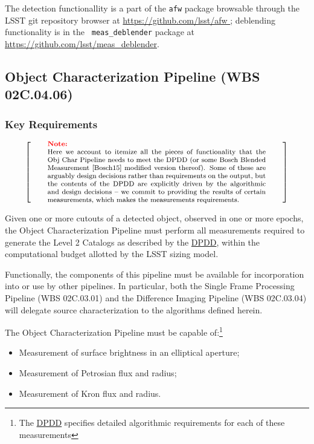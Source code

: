 \documentclass[12pt]{article}
\newcommand{\ds}[2]{{\color{blue} \href{https://docushare.lsstcorp.org/docushare/dsweb/Get/#1}{#2}}\xspace}
\newcommand{\DPDD}{\ds{LSE-163}{DPDD}}
\newcommand{\wbsSFM}{WBS 02C.03.01}
\newcommand{\wbsDiffim}{WBS 02C.03.04}
\newcommand{\wbsObjChar}{WBS 02C.04.06}
\newenvironment{note}[1][Note]
{
  \begin{displaymath}
    \left[ \qquad
    \begin{minipage}[h]{.75\linewidth}
      \color{red} \footnotesize
      \textbf{#1:} \newline
      \color{black}
}
{
    \end{minipage}
    \normalsize
    \qquad \right]
  \end{displaymath}
}
\begin{document}
The detection functionallity is a part of the {\tt afw} package
browsable through the LSST git repository browser at
\url{https://github.com/lsst/afw }; deblending functionality is in the {\tt
meas\_deblender} package at \url{https://github.com/lsst/meas_deblender}.

\clearpage

\subsection{Object Characterization Pipeline (\wbsObjChar)}

\subsubsection{Key Requirements}

\begin{note}
Here we account to itemize all the pieces of functionality that the Obj Char Pipeline needs to meet the DPDD (or some Bosch Blended Measurement \cite{Bosch15} modified version thereof). Some of these are arguably design decisions rather than requirements on the output, but the contents of the DPDD are explicitly driven by the algorithmic and design decisions -- we commit to providing the results of certain measurements, which makes the measurements requirements.
\end{note}

Given one or more cutouts of a detected object, observed in one or more epochs, the Object Characterization Pipeline must perform all measurements required to generate the Level 2 Catalogs as described by the \DPDD{}, within the computational budget allotted by the LSST sizing model.

Functionally, the components of this pipeline must be available for incorporation into or use by other pipelines. In particular, both the Single Frame Processing Pipeline (\wbsSFM) and the Difference Imaging Pipeline (\wbsDiffim) will delegate source characterization to the algorithms defined herein.

The Object Characterization Pipeline must be capable of:\footnote{The \DPDD{} specifies detailed algorithmic requirements for each of these measurements}
\begin{itemize}
  \item{Measurement of surface brightness in an elliptical aperture;}
  \item{Measurement of Petrosian flux and radius;}
  \item{Measurement of Kron flux and radius.}
\end{itemize}
\end{document}
